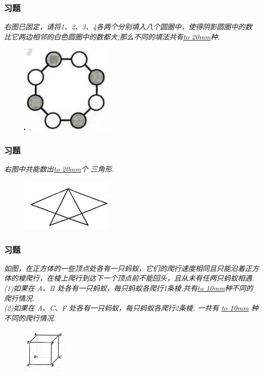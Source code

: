 \begin{frame}
    \frametitle{习题\theframecounter}
    \textit{右图已固定，请将1、2、3、4各两个分别填入八个圆圈中，使得阴影圆圈中的数比它两边相邻的白色圆圈中的数都大;那么不同的填法共有\underline{\hbox to 20mm{}}种.}
    \begin{figure}[H] 
        \centering
        \includegraphics[width=0.4\textwidth]{./pics/Chapter_6/6.png}
    \end{figure}
\end{frame}

\begin{frame}
    \frametitle{习题\theframecounter}
    \vspace*{-1cm}
    \textit{右图中共能数出\underline{\hbox to 20mm{}}个 三角形.}
    \begin{figure}[H] 
        \centering
        \includegraphics[width=0.4\textwidth]{./pics/Chapter_6/7.png}
    \end{figure}
\end{frame}


\begin{frame}
    \frametitle{习题\theframecounter}
    \textit{如图，在正方体的一些顶点处各有一只蚂蚁，它们的爬行速度相同且只能沿着正方体的棱爬行，在棱上爬行到达下一个顶点前不能回头，且从未有任两只蚂蚁相遇.\\
    (1)如果在 A、B 处各有一只蚂蚁，每只蚂蚁各爬行1条棱,共有\underline{\hbox to 10mm{}}种不同的爬行情况.\\
    (2)如果在 A、C、F 处各有一只蚂蚁，每只蚂蚁各爬行2条棱, 
    一共有 \underline{\hbox to 10mm{}} 种不同的爬行情况.
    }
    \begin{figure}[H] 
        \centering
        \includegraphics[width=0.2\textwidth]{./pics/Chapter_4/2.png}
    \end{figure}
\end{frame}


